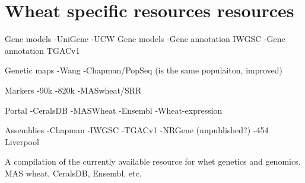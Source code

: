 

%









\section{Wheat specific resources resources}
\label{lit:wheatResourcers}
Gene models
-UniGene
-UCW Gene models
-Gene annotation IWGSC
-Gene annotation TGACv1

Genetic maps
-Wang
-Chapman/PopSeq (is the same populaiton, improved)

Markers
-90k
-820k
-MASwheat/SRR

Portal
-CeralsDB
-MASWheat
-Ensembl
-Wheat-expression

Assemblies
-Chapman
-IWGSC
-TGACv1
-NRGene (unpublished?)
-454 Liverpool

A compilation of the currently available resource for whet genetics and genomics. MAS wheat, CeralsDB, Ensembl, etc.  